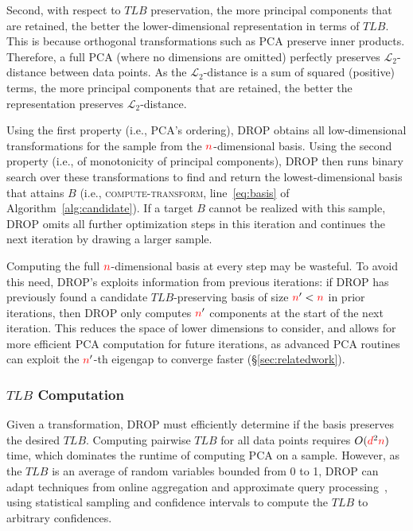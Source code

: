 Second, with respect to $TLB$ preservation, the more principal components that are retained, the better the lower-dimensional representation in terms of $TLB$.  
This is because orthogonal transformations such as PCA preserve inner products. 
Therefore, a full PCA (where no dimensions are omitted) perfectly preserves $\mathcal{L}_2$-distance between data points. 
As the $\mathcal{L}_2$-distance is a sum of squared (positive) terms, the more principal components that are retained, the better the representation preserves $\mathcal{L}_2$-distance.

Using the first property (i.e., PCA's ordering), DROP obtains all low-dimensional transformations for the sample from the ${\color{red}n}$-dimensional basis.  
Using the second property (i.e., of monotonicity of principal components), DROP then runs binary search over these transformations to find and return the lowest-dimensional basis that attains $B$ (i.e., \textsc{compute-transform}, line~\ref{eq:basis} of Algorithm~\ref{alg:candidate}).
If a target $B$ cannot be realized with this sample, DROP omits all further optimization steps in this iteration and continues the next iteration by drawing a larger sample.

Computing the full ${\color{red}n}$-dimensional basis at every step may be wasteful. 
To avoid this need, DROP's exploits information from previous iterations:  if DROP has previously found a candidate $TLB$-preserving basis of size ${\color{red}n}' < {\color{red}n}$ in prior iterations, then DROP only computes ${\color{red}n}'$ components at the start of the next iteration. 
This reduces the space of lower dimensions to consider, and allows for more efficient PCA computation for future iterations, as advanced PCA routines can exploit the ${\color{red}n}'$-th eigengap to converge faster (\S\ref{sec:relatedwork}).


\subsubsection{$TLB$ Computation}

Given a transformation, DROP must efficiently determine if the basis preserves the desired $TLB$.
Computing pairwise $TLB$ for all data points requires $O({\color{red}d}^2{\color{red}n})$ time, which dominates the runtime of computing PCA on a sample.
However, as the $TLB$ is an average of random variables bounded from 0 to 1, DROP can adapt techniques from online aggregation and approximate query processing~\cite{onlineagg,barzan-keynote}, using statistical sampling and confidence intervals to compute the $TLB$ to arbitrary confidences.

